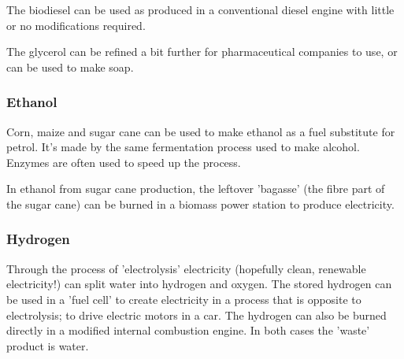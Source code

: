The biodiesel can be used as produced in a conventional diesel
engine with little or no modifications required.

The glycerol can be refined a bit further for pharmaceutical
companies to use, or can be used to make soap.

\subsubsection*{Ethanol}

Corn, maize and sugar cane can be used to make ethanol as a fuel
substitute for petrol. It's made by the same fermentation process
used to make alcohol. Enzymes are often used to speed up the
process.

In ethanol from sugar cane production, the leftover 'bagasse' (the
fibre part of the sugar cane) can be burned in a biomass power
station to produce electricity.

\subsubsection*{Hydrogen} Through the process of 'electrolysis'
electricity (hopefully clean, renewable electricity!) can split
water into hydrogen and oxygen. The stored hydrogen can be used in a
'fuel cell' to create electricity in a process that is opposite to
electrolysis; to drive electric motors in a car. The hydrogen can also be burned directly in a modified internal combustion engine. In both cases the 'waste' product is water.







